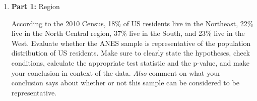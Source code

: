 \documentclass[11pt]{article}
\newcommand{\soln}[1]{}
\begin{document}
\begin{enumerate}

\item \textbf{Part 1:} Region

According to the 2010 Census, 18\% of US residents live in the Northeast, 22\% live in the North Central region, 37\% live in the South, and 23\% live in the West. Evaluate whether the ANES sample is representative of the population distribution of US residents. Make sure to clearly state the hypotheses, check conditions, calculate the appropriate test statistic and the p-value, and make your conclusion in context of the data. \emph{Also} comment on what your conclusion says about whether or not this sample can be considered to be representative.

\soln{$H_0$: The sample distribution of regions follows the census distribution. \\
$H_A$: The sample distribution of regions does not follow the census distribution.
\begin{itemize}
\item Independence:
\begin{itemize}
\item 500 $<$ 10\% of US population
\item Sample is random
\item Each person in the sample is only in one cell
\end{itemize}
\item Sample size: \\
$E_{NE}  500 \times 0.18 = 90$ $\qquad$ $E_{NC}  500 \times 0.22 = 110$ \\
$E_{S}  500 \times 0.37 = 185$ $\qquad$ $E_{W}  500 \times 0.23 = 115$ \\
All expected counts are greater than 5.
\end{itemize}
$\chi^2 = \frac{(83 - 90)^2}{90} + \frac{(121 - 110)^2}{110} + \frac{(193 - 185)^2}{185} + \frac{(103 - 115)^2}{115} \approx 3.24$ \\
$df = 4 - 1 = 3$ \\
$p-value > 0.3$ \\
p-value is large so we fail to reject $H_0$, \\
the data do not provide convincing evidence that the sample distribution of regions does not follow the census distribution. \\
The sample is likely representative since the distribution of sampled individual matches the distribution regional population distribution.
}


\end{enumerate}
\end{document}
